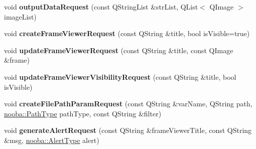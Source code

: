 \begin{DoxyCompactItemize}
\item 
\hypertarget{class_nooba_plugin_a_p_i_aec28bddd8844b426d781eec2d77aa3d0}{void {\bfseries output\-Data\-Request} (const Q\-String\-List \&str\-List, Q\-List$<$ Q\-Image $>$ image\-List)}\label{class_nooba_plugin_a_p_i_aec28bddd8844b426d781eec2d77aa3d0}

\item 
\hypertarget{class_nooba_plugin_a_p_i_a52a0aae14f9ee31427409868a8014ee9}{void {\bfseries create\-Frame\-Viewer\-Request} (const Q\-String \&title, bool is\-Visible=true)}\label{class_nooba_plugin_a_p_i_a52a0aae14f9ee31427409868a8014ee9}

\item 
\hypertarget{class_nooba_plugin_a_p_i_a5716225fae1e93b57ab623fab6e509b8}{void {\bfseries update\-Frame\-Viewer\-Request} (const Q\-String \&title, const Q\-Image \&frame)}\label{class_nooba_plugin_a_p_i_a5716225fae1e93b57ab623fab6e509b8}

\item 
\hypertarget{class_nooba_plugin_a_p_i_a5918fa3bc2b6ec19f632783010b357cc}{void {\bfseries update\-Frame\-Viewer\-Visibility\-Request} (const Q\-String \&title, bool is\-Visible)}\label{class_nooba_plugin_a_p_i_a5918fa3bc2b6ec19f632783010b357cc}

\item 
\hypertarget{class_nooba_plugin_a_p_i_ac28438c24ca60e790eabf1c97c8dedbc}{void {\bfseries create\-File\-Path\-Param\-Request} (const Q\-String \&var\-Name, Q\-String path, \hyperlink{namespacenooba_a63ed48aaaaeaf49835daddab6c63695e}{nooba\-::\-Path\-Type} path\-Type, const Q\-String \&filter)}\label{class_nooba_plugin_a_p_i_ac28438c24ca60e790eabf1c97c8dedbc}

\item 
\hypertarget{class_nooba_plugin_a_p_i_a1c5091983135dea3d45050600e8b1b73}{void {\bfseries generate\-Alert\-Request} (const Q\-String \&frame\-Viewer\-Title, const Q\-String \&msg, \hyperlink{namespacenooba_a1e392455e0e2d24934ea87baaf5eb43c}{nooba\-::\-Alert\-Type} alert)}\label{class_nooba_plugin_a_p_i_a1c5091983135dea3d45050600e8b1b73}

\end{DoxyCompactItemize}

